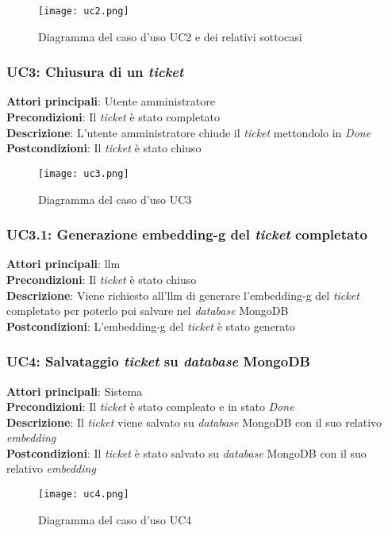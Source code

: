 \begin{figure}[H]
    \centering
    \texttt{[image: uc2.png]}
    \caption{Diagramma del caso d'uso UC2 e dei relativi sottocasi}
    \label{fig:UC2}
\end{figure}

\subsubsection{UC3: Chiusura di un \textit{ticket}}
\textbf{Attori principali}: Utente amministratore \\
\textbf{Precondizioni}: Il \textit{ticket} è stato completato \\
\textbf{Descrizione}: L'utente amministratore chiude il \textit{ticket} mettondolo in \textit{Done}\\ 
\textbf{Postcondizioni}: Il \textit{ticket} è stato chiuso \\

\begin{figure}[H]
    \centering
    \texttt{[image: uc3.png]}
    \caption{Diagramma del caso d'uso UC3}
    \label{fig:UC3}
\end{figure}


\subsubsection{UC3.1: Generazione \gls{embedding-g} del \textit{ticket} completato}
\textbf{Attori principali}: \gls{llm} \\
\textbf{Precondizioni}: Il \textit{ticket} è stato chiuso \\
\textbf{Descrizione}: Viene richiesto all'\gls{llm} di generare l'\gls{embedding-g} del \textit{ticket} completato per poterlo poi salvare nel \textit{database} MongoDB \\
\textbf{Postcondizioni}: L'\gls{embedding-g} del \textit{ticket} è stato generato \\

\subsubsection{UC4: Salvataggio \textit{ticket} su \textit{database} MongoDB}
\textbf{Attori principali}: Sistema \\
\textbf{Precondizioni}: Il \textit{ticket} è stato compleato e in stato \textit{Done} \\
\textbf{Descrizione}: Il \textit{ticket} viene salvato su \textit{database} MongoDB con il suo relativo \textit{embedding} \\
\textbf{Postcondizioni}: Il \textit{ticket} è stato salvato su \textit{database} MongoDB con il suo relativo \textit{embedding} \\
\begin{figure}[H]
    \centering
    \texttt{[image: uc4.png]}
    \caption{Diagramma del caso d'uso UC4}
    \label{fig:UC5}
\end{figure}


